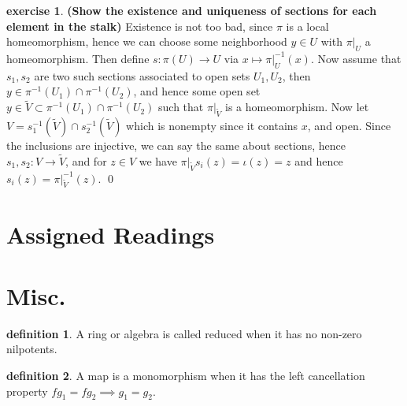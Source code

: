 \documentclass[10.5pt]{article}
\theoremstyle{definition}
\newtheorem{exe}{exercise}
\newtheorem{definition}{definition}
\begin{document}
    \begin{exe}\label{Existence and uniqueness sections on stalks}
        \textbf{(Show the existence and uniqueness of sections for each element in the stalk)}
        Existence is not too bad, since \(\pi\) is a local homeomorphism, hence we can choose some neighborhood \(y \in U\) with \(\pi\vert_U\) a homeomorphism. Then define \(s: \pi(U) \to U\) via \(x \mapsto \pi\vert_U^{-1}(x)\). Now assume that \(s_1,s_2\) are two such sections associated to open sets \(U_1,U_2\), then \(y \in \pi^{-1}(U_1) \cap \pi^{-1}(U_2)\), and hence some open set \(y \in \tilde{V} \subset \pi^{-1}(U_1) \cap \pi^{-1}(U_2)\) such that \(\pi\vert_{\tilde{V}}\) is a homeomorphism. Now let \(V = s_1^{-1}(\tilde{V}) \cap s_2^{-1}(\tilde{V})\) which is nonempty since it contains \(x\), and open. Since the inclusions are injective, we can say the same about sections, hence \(s_1,s_2:  V \to \tilde{V}\), and for \(z \in V\) we have \(\pi\vert_{\tilde{V}}s_i(z) = \iota(z) = z\) and hence \(s_i(z) = \pi\vert_{\tilde{V}}^{-1}(z)\). \qed
    \end{exe}
    \appendix
    
    \section{Assigned Readings}

    \section{Misc.}
    \begin{definition}
        A ring or algebra is called reduced when it has no non-zero nilpotents.
    \end{definition}
    \begin{definition}
        A map is a monomorphism when it has the left cancellation property \(fg_1 = fg_2 \implies g_1 = g_2\).
    \end{definition}
\end{document}
